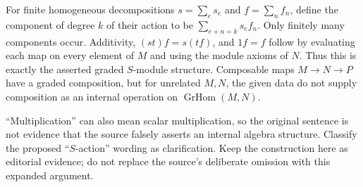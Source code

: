 For finite homogeneous decompositions \(s=\sum_e s_e\) and \(f=\sum_n f_n\), define the component of degree \(k\) of their action to be \(\sum_{e+n=k}s_ef_n\). Only finitely many components occur. Additivity, \((st)f=s(tf)\), and \(1f=f\) follow by evaluating each map on every element of \(M\) and using the module axioms of \(N\). Thus this is exactly the asserted graded \(S\)-module structure. Composable maps \(M\to N\to P\) have a graded composition, but for unrelated \(M,N\), the given data do not supply composition as an internal operation on \(\operatorname{GrHom}(M,N)\).

``Multiplication'' can also mean scalar multiplication, so the original sentence is not evidence that the source falsely asserts an internal algebra structure. Classify the proposed ``\(S\)-action'' wording as clarification. Keep the construction here as editorial evidence; do not replace the source's deliberate omission with this expanded argument.
